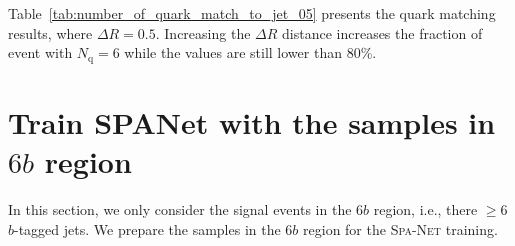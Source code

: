 \documentclass[12pt]{article}
\begin{document}
        Table~\ref{tab:number_of_quark_match_to_jet_05} presents the quark matching results, where $\Delta R = 0.5$. Increasing the $\Delta R$ distance increases the fraction of event with $N_{\text{q}} = 6$ while the values are still lower than 80\%.
        \begin{table}[htpb]
            \centering
            \caption{The quark matching table. $N_{\text{q}}$ is the number of quarks that can be matched to jets in an event.}
            \label{tab:number_of_quark_match_to_jet_05}
        \end{table}
\section{Train SPANet with the samples in \texorpdfstring{$6b$}{6b} region}%
\label{sec:train_spanet_with_the_samples_in_6b_region}
    In this section, we only consider the signal events in the $6b$ region, i.e., there $\ge 6$ $b$-tagged jets. We prepare the samples in the $6b$ region for the \textsc{Spa-Net} training. 
\end{document}
